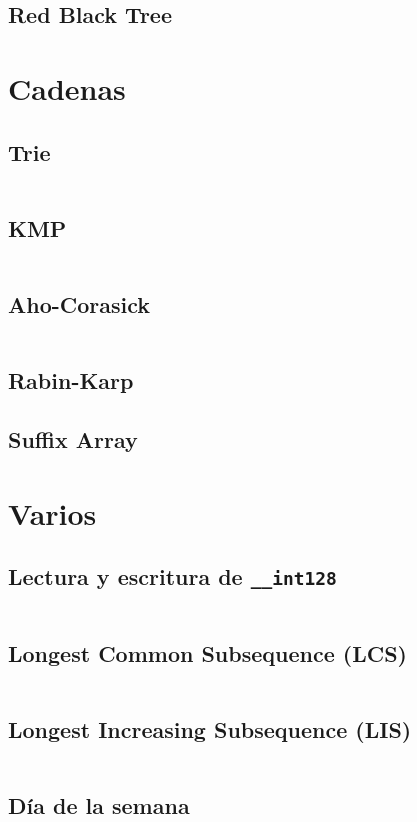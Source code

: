 \documentclass[11pt]{article}
\begin{document}
		
		\subsection{Red Black Tree}
		
		
	\newpage
	\section{Cadenas}
		\subsection{Trie}
		\inputminted[tabsize=2,breaklines,firstline=144,lastline=196,fontsize=\small]{c++}{strings.cpp}
		
		\subsection{KMP}
		\inputminted[tabsize=2,breaklines,firstline=4,lastline=39,fontsize=\small]{c++}{strings.cpp}
		
		\subsection{Aho-Corasick}
		\inputminted[tabsize=2,breaklines,firstline=41,lastline=142,fontsize=\small]{c++}{strings.cpp}
		
		\subsection{Rabin-Karp}
		
		
		\subsection{Suffix Array}
		
	
	\newpage
	\section{Varios}
		\subsection{Lectura y escritura de \texttt{\_\_int128}}
		\inputminted[tabsize=2,breaklines,firstline=46,lastline=83,fontsize=\small]{c++}{misc.cpp}
		
		\subsection{Longest Common Subsequence (LCS)}
		\inputminted[tabsize=2,breaklines,firstline=21,lastline=33,fontsize=\small]{c++}{misc.cpp}
		
		\subsection{Longest Increasing Subsequence (LIS)}
		\inputminted[tabsize=2,breaklines,firstline=5,lastline=19,fontsize=\small]{c++}{misc.cpp}
		
		\subsection{Día de la semana}
		\inputminted[tabsize=2,breaklines,firstline=35,lastline=44,fontsize=\small]{c++}{misc.cpp}
\end{document}
